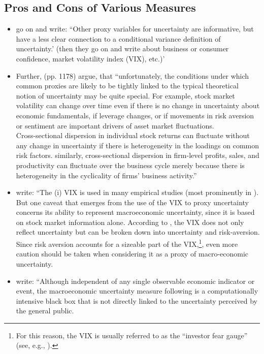 \documentclass[a4paper,12pt,oneside,pointednumbers,bibtotoc,bigheadings,liststotoc]{scrbook}
\begin{document}
\subsection{Pros and Cons of Various Measures}
\begin{itemize}
	\item \citet{orlikandveldkamp:14} go on and write: ``Other proxy variables for uncertainty are informative, but have a less clear connection to a conditional variance definition of uncertainty.' (then they go on and write about business or consumer confidence, market volatility index (VIX), etc.)'
	\item Further, \citet{juradoetal:15} (pp. 1178) argue, that ``unfortunately, the conditions under which common proxies are likely to be tightly linked to the typical theoretical notion of uncertainty may be quite special. For example, stock market volatility can change over time even if there is no change in uncertainty about economic fundamentals, if leverage changes, or if movements in risk aversion or sentiment are important drivers of asset market fluctuations.\\
Cross-sectional dispersion in individual stock returns can fluctuate without any change in uncertainty if there is heterogeneity in the loadings on common risk factors. similarly, cross-sectional dispersion in firm-level profits, sales, and productivity can fluctuate over the business cycle merely because there is heterogeneity in the cyclicality of firms' business activity.'' 
	\item \citet[p. 12]{bontempietal:16} write: ``The (i) VIX is used in many empirical studies (most prominently in \citet{bloom:09}). But one caveat that emerges from the use of the VIX to proxy uncertainty concerns its ability to represent macroeconomic uncertainty, since it is based on stock market information alone. According to \citet{bekeartetal:13}, the VIX does not only reflect uncertainty but can be broken down into uncertainty and risk-aversion. Since risk aversion accounts for a sizeable part of the VIX,\footnote{For this reason, the VIX is usually referred to as the ``investor fear gauge'' (see, e.g., \citet{whaley:00}).}, even more caution should be taken when considering it as a proxy of macro-economic uncertainty. 
	\item \citet[p. 13]{bontempietal:16} write: ``Although independent of any single observable economic indicator or event, the macroeconomic uncertainty measure following \citet{juradoetal:15} is a computationally intensive black box that is not directly linked to the uncertainty perceived by the general public.  
\end{itemize}
\end{document}
